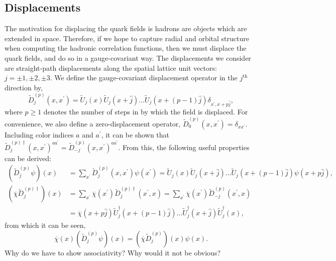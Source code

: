     \subsection{Displacements}
    The motivation for displacing the quark fields is hadrons are objects which are extended in space. Therefore, if we hope to capture radial and orbital structure when computing the hadronic correlation functions, then we must displace the quark fields, and do so in a gauge-covariant way. The displacements we consider are straight-path displacements along the spatial lattice unit vectors: $j = \pm 1, \pm 2, \pm 3$. We define the gauge-covariant displacement operator in the $j^{\mathrm{th}}$ direction by,
    \begin{equation}
        \widetilde{D}_{j}^{(p)}\left(x, x^{\prime}\right)=\widetilde{U}_{j}(x) \widetilde{U}_{j}(x+\hat{j}) \ldots \widetilde{U}_{j}(x+(p-1) \hat{j}) \delta_{x^{\prime}, x+p \hat{j}},
    \end{equation}
    where $p \geq 1$ denotes the number of steps in by which the field is displaced. For convenience, we also define a zero-displacement operator, $\widetilde{D}_{0}^{(p)}\left(x, x^{\prime}\right)=\delta_{x x^{\prime}}.$ Including color indices $a$ and $a^\prime$, it can be shown that $\widetilde{D}_{j}^{(p) \dagger}\left(x, x^{\prime}\right)^{a a^{\prime}}=\widetilde{D}_{-j}^{(p)}\left(x, x^{\prime}\right)^{a a^{\prime}}.$ From this, the following useful properties can be derived:
    \begin{equation}
        \begin{aligned}
            \left(\widetilde{D}_{j}^{(p)} \psi\right)(x)&=\sum_{x^{\prime}} \widetilde{D}_{j}^{(p)}\left(x, x^{\prime}\right) \psi\left(x^{\prime}\right)=\widetilde{U}_{j}(x) \widetilde{U}_{j}(x+\hat{j}) \ldots \widetilde{U}_{j}(x+(p-1) \hat{j}) \psi(x+p \hat{j}),\\
            \left(\overline{\chi} \widetilde{D}_{j}^{(p) \dagger}\right)(x)&=\sum_{x^{\prime}} \overline{\chi}\left(x^{\prime}\right) \widetilde{D}_{j}^{(p) \dagger}\left(x^{\prime}, x\right)=\sum_{x^{\prime}} \overline{\chi}\left(x^{\prime}\right) \widetilde{D}_{-j}^{(p)}\left(x^{\prime}, x\right)\\
            &=\overline{\chi}(x+p \hat{j}) \widetilde{U}_{j}^{\dagger}(x+(p-1) \hat{j}) \ldots \widetilde{U}_{j}^{\dagger}(x+\hat{j}) \widetilde{U}_{j}^{\dagger}(x),
        \end{aligned}
    \end{equation}
    from which it can be seen,
    \begin{equation}
        \overline{\chi}(x)\left(\widetilde{D}_{j}^{(p)} \psi\right)(x)=\left(\overline{\chi} \widetilde{D}_{j}^{(p)}\right)(x) \psi(x).
    \end{equation}
    {\color{red}Why do we have to show associativity? Why would it not be obvious?}

